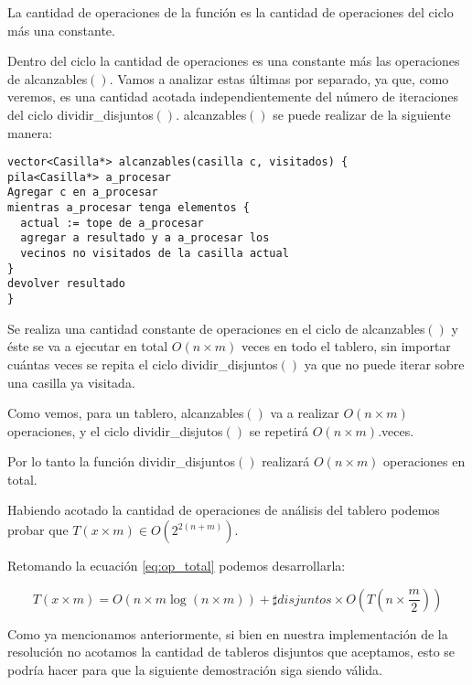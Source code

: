 \documentclass[a4paper, 12pt] {article}
\begin{document}
La cantidad de operaciones de la funci\'on es la cantidad de operaciones del ciclo m\'as una constante. 


Dentro del ciclo la cantidad de operaciones es una constante m\'as las operaciones de alcanzables$\left( \right) $. Vamos a analizar estas \'ultimas por separado, ya que, como veremos, es una cantidad acotada independientemente del n\'umero de iteraciones del ciclo dividir\_disjuntos$\left( \right) $.
alcanzables$\left( \right) $ se puede realizar de la siguiente manera:

\begin{verbatim}
vector<Casilla*> alcanzables(casilla c, visitados) {
pila<Casilla*> a_procesar
Agregar c en a_procesar
mientras a_procesar tenga elementos {
  actual := tope de a_procesar
  agregar a resultado y a a_procesar los 
  vecinos no visitados de la casilla actual
}
devolver resultado
}
\end{verbatim}

Se realiza una cantidad constante de operaciones en el ciclo de alcanzables$\left( \right) $ y \'este se va a ejecutar en total $O\left( n\times m\right) $ veces en todo el tablero, sin importar cu\'antas veces se repita el ciclo dividir\_disjuntos$\left( \right) $ ya que no puede iterar sobre una casilla ya visitada.

Como vemos, para un tablero, alcanzables$\left( \right) $ va a realizar $O\left( n \times m\right) $ operaciones, y el ciclo dividir\_disjutos$\left( \right) $ se repetir\'a $O\left( n\times m\right) $.veces.

Por lo tanto la funci\'on dividir\_disjuntos$\left( \right) $ realizar\'a $O\left( n \times m\right) $ operaciones en total.	


Habiendo acotado la cantidad de operaciones de an\'alisis del tablero podemos probar que $T\left( x \times m\right) \in O\left( 2^{2\left( n+m\right) }\right) $.

Retomando la ecuaci\'on \ref{eq:op_total} podemos desarrollarla:

\begin{equation}
T\left( x \times m\right) = O\left( n\times m \log \left( n\times m\right) \right) + \sharp disjuntos \times O \left( T\left( n \times \frac{m}{2} \right) \right) 
\end{equation}
 

Como ya mencionamos anteriormente, si bien en nuestra implementaci\'on de la resoluci\'on no acotamos la cantidad de tableros disjuntos que aceptamos, esto se podr\'ia hacer para que la siguiente demostraci\'on siga siendo v\'alida.
\end{document}
